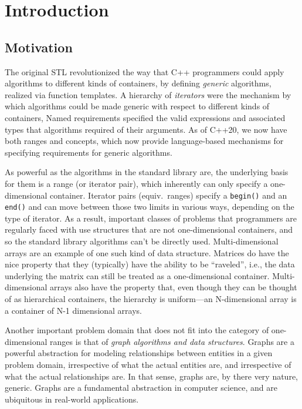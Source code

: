 
\chapter{Introduction}
\label{ch:introduction}

\section{Motivation}

The original STL revolutionized the way that C++ programmers could apply algorithms to different kinds of containers, by defining \emph{generic} algorithms, realized via function templates.  
A hierarchy of \emph{iterators} were the mechanism by which algorithms could be made generic with respect to different kinds of containers,
Named requirements specified the valid expressions and associated types that algorithms required of their arguments.  As of C++20, we now have both ranges and concepts, which
now provide language-based mechanisms for specifying requirements for generic algorithms.

As powerful as the algorithms in the standard library are, the underlying basis for them is a range (or iterator pair), which inherently can only specify a one-dimensional container.  
Iterator pairs (equiv.\ ranges) specify a \lstinline{begin()} and an \lstinline{end()} and can move between those two limits in various ways, depending on the type of iterator.
As a result, important classes of problems that programmers are regularly faced with use structures that are not one-dimensional containers, and so the standard library algorithms can't be directly used.
Multi-dimensional arrays are an example of one such kind of data structure. Matrices do have the nice property that they (typically) have the ability to be ``raveled'', i.e., the data underlying the matrix can still be treated as a one-dimensional container.  Multi-dimensional arrays also have the property that, even though they can be thought of as hierarchical containers, the hierarchy is uniform---an N-dimensional array is a container of N-1 dimensional arrays.

Another important problem domain that does not fit into the category of one-dimensional ranges is that of \emph{graph algorithms and data structures}.
Graphs are a powerful abstraction for modeling relationships between entities in a given problem domain,
irrespective of what the actual entities are, and irrespective of what the actual relationships are.
In that sense, graphs are, by there very nature, generic.
Graphs are a fundamental abstraction in computer science, and are ubiquitous in real-world applications.

